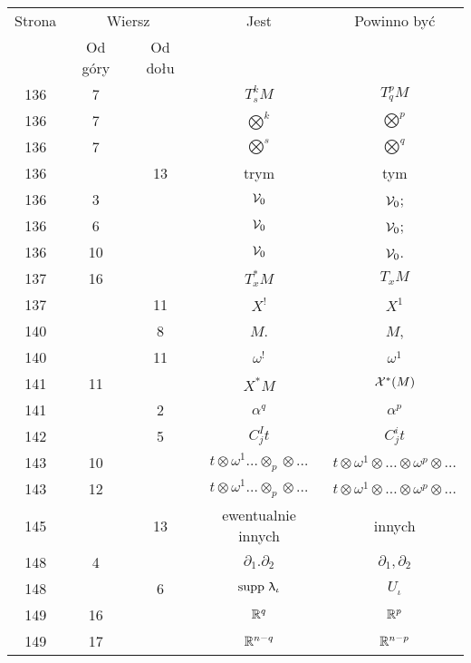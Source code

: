 \documentclass[a4paper,11pt]{article}
\begin{document}
\begin{center}
  \begin{tabular}{|c|c|c|c|c|}
    \hline
    Strona & \multicolumn{2}{c|}{Wiersz} & Jest
                              & Powinno być \\ \cline{2-3}
    & Od góry & Od dołu & & \\
    \hline
    136 & \hphantom{0}7 & & $T^{ k }_{ s }M$ & $T^{ p }_{ q }M$ \\
    136 & \hphantom{0}7 & & $\bigotimes^{ k }$ & $\bigotimes^{ p }$ \\
    136 & \hphantom{0}7 & & $\bigotimes^{ s }$ & $\bigotimes^{ q }$ \\
    136 & & 13 & trym & tym \\
    136 & \hphantom{0}3 & & $\mathcal{V}_{ 0 }$ & $\mathcal{V}_{ 0 }$; \\
    136 & \hphantom{0}6 & & $\mathcal{V}_{ 0 }$ & $\mathcal{V}_{ 0 }$; \\
    136 & 10 & & $\mathcal{V}_{ 0 }$ & $\mathcal{V}_{ 0 }$. \\
    137 & 16 & & $T^{ * }_{ x }M$ & $T_{ x }M$ \\
    137 & & 11 & $X^{ ! }$ & $X^{ 1 }$ \\
    140 & & \hphantom{0}8 & $M$. & $M$, \\
    140 & & 11 & $\omega^{ ! }$ & $\omega^{ 1 }$ \\
    141 & 11 & & $X^{ * } M$ & $\mathcal{X}^{ * }( M )$ \\
    141 & & \hphantom{0}2 & $\alpha^{ q }$ & $\alpha^{ p }$ \\
    142 & & \hphantom{0}5 & $C^{ I }_{ j } t$ & $C^{ i }_{ j } t$ \\
    143 & 10 & & $t \otimes \omega^{ 1 } \ldots \otimes_{ p } \otimes \ldots$
           & $t \otimes \omega^{ 1 } \otimes \ldots \otimes \omega^{ p } \otimes \ldots$ \\
    143 & 12 & & $t \otimes \omega^{ 1 } \ldots \otimes_{ p } \otimes \ldots$
           & $t \otimes \omega^{ 1 } \otimes \ldots \otimes \omega^{ p } \otimes \ldots$ \\
    145 & & 13 & ewentualnie innych & innych \\
    148 & \hphantom{0}4 & & $\partial_{ 1 }.\partial_{ 2 }$ & $\partial_{ 1 }, \partial_{ 2 }$ \\
    148 & & \hphantom{0}6 & $\mathrm{supp}\,\, \uplambda_{ \iota }$ & $U_{ \iota }$ \\
    149 & 16 & & $\mathbb{R}^{ q }$ & $\mathbb{R}^{ p }$ \\
    149 & 17 & & $\mathbb{R}^{ n - q }$ & $\mathbb{R}^{ n - p }$ \\

\end{tabular}
\end{center}
\end{document}
